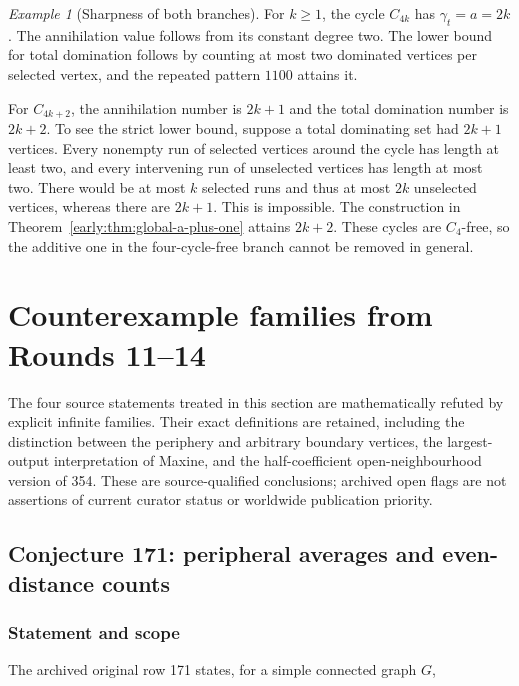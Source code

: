 \documentclass[11pt,a4paper]{article}
\theoremstyle{definition}\newtheorem{definition}[theorem]{Definition}
\theoremstyle{remark}\newtheorem{remark}[theorem]{Remark}
\newtheorem{example}[theorem]{Example}
\begin{document}
\begin{example}[Sharpness of both branches]
For $k\geq1$, the cycle $C_{4k}$ has
$\gamma_t=a=2k$.  The annihilation value follows from its constant
degree two.  The lower bound for total domination follows by
counting at most two dominated vertices per selected vertex,
and the repeated pattern $1100$ attains it.

For $C_{4k+2}$, the annihilation number is $2k+1$ and the total
domination number is $2k+2$.  To see the strict lower bound, suppose
a total dominating set had $2k+1$ vertices.  Every nonempty run
of selected vertices around the cycle has length at least two,
and every intervening run of unselected vertices has length at
most two.  There would be at most $k$ selected runs and thus at
most $2k$ unselected vertices, whereas there are $2k+1$.
This is impossible.  The construction in
Theorem~\ref{early:thm:global-a-plus-one} attains $2k+2$.
These cycles are $C_4$-free, so the additive one in the
four-cycle-free branch cannot be removed in general.
\end{example}



\section{Counterexample families from Rounds 11--14}\label{late:counterexamples}
The four source statements treated in this section are mathematically
refuted by explicit infinite families. Their exact definitions are retained,
including the distinction between the periphery and arbitrary boundary
vertices, the largest-output interpretation of Maxine, and the
half-coefficient open-neighbourhood version of 354. These are source-qualified
conclusions; archived open flags are not assertions of current curator
status or worldwide publication priority.


\subsection{Conjecture 171: peripheral averages and even-distance counts}\label{late:171}

\subsubsection{Statement and scope}\label{late:171:statement-and-scope}

The archived original row 171 states, for a simple connected graph
\(G\),
\end{document}
